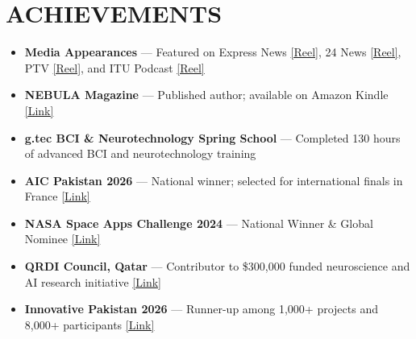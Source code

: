 \documentclass[letterpaper,8.5pt]{article}
\newcommand{\resumeItem}[1]{
  \item \small{#1}
}
\begin{document}
\section{ACHIEVEMENTS}
\begin{itemize}
\resumeItem{\textbf{Media Appearances} — Featured on Express News \href{https://www.instagram.com/reel/DDPYqbKqwj1/}{[Reel]}, 24 News \href{https://www.instagram.com/reel/DDM2wrHKapq/}{[Reel]}, PTV \href{https://www.instagram.com/reel/DIgQsOLKF_b/}{[Reel]}, and ITU Podcast \href{https://www.instagram.com/reel/DHdmzG6KDvw/}{[Reel]}}
\resumeItem{\textbf{NEBULA Magazine} — Published author; available on Amazon Kindle \href{https://www.amazon.com/Archives-2-NEBULA-Mehar-Ali-ebook/dp/B0DVLS5161}{[Link]}}
\resumeItem{\textbf{g.tec BCI \& Neurotechnology Spring School} — Completed 130 hours of advanced BCI and neurotechnology training}
\resumeItem{\textbf{AIC Pakistan 2026} — National winner; selected for international finals in France \href{https://www.linkedin.com/posts/information-technology-university_\%F0\%9D\%97\%9C\%F0\%9D\%97\%A7\%F0\%9D\%97\%A8-\%F0\%9D\%97\%A7\%F0\%9D\%97\%B2\%F0\%9D\%97\%AE\%F0\%9D\%97\%BA-\%F0\%9D\%98\%81\%F0\%9D\%97\%BC-\%F0\%9D\%97\%A5\%F0\%9D\%97\%B2\%F0\%9D\%97\%BD\%F0\%9D\%97\%BF\%F0\%9D\%97\%B2\%F0\%9D\%98\%80\%F0\%9D\%97\%B2\%F0\%9D\%97\%BB\%F0\%9D\%98\%81-\%F0\%9D\%97\%A3\%F0\%9D\%97\%AE\%F0\%9D\%97\%B8\%F0\%9D\%97\%B6\%F0\%9D\%98\%80\%F0\%9D\%98\%81\%F0\%9D\%97\%AE\%F0\%9D\%97\%BB-activity-7440108338027065344-qhc0}{[Link]}}
\resumeItem{\textbf{NASA Space Apps Challenge 2024} — National Winner \& Global Nominee \href{https://www.spaceappschallenge.org/nasa-space-apps-2024/find-a-team/nebula-galaxar/?tab=details}{[Link]}}
\resumeItem{\textbf{QRDI Council, Qatar} — Contributor to \$300,000 funded neuroscience and AI research initiative \href{https://www.linkedin.com/feed/update/urn:li:activity:7424050684309917696/}{[Link]}}
\resumeItem{\textbf{Innovative Pakistan 2026} — Runner-up among 1,000+ projects and 8,000+ participants \href{https://www.linkedin.com/feed/update/urn:li:activity:7470778147882569728/}{[Link]}}
\end{itemize}

\end{document}

